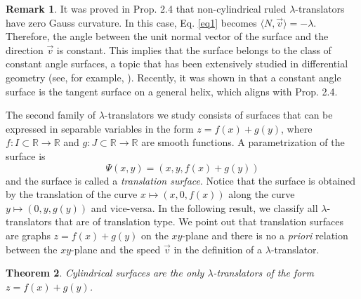 \documentclass[12pt]{amsart}
\def\r{\mathbb R}
\newtheorem{theorem}{Theorem}[section]
\theoremstyle{definition}
\newtheorem{remark}[theorem]{Remark}
\begin{document}
\begin{remark}
It was proved in Prop. 2.4 that non-cylindrical ruled $\lambda$-translators have zero Gauss curvature. In this case, Eq.   \eqref{eq1} becomes $\langle N, \vec{v} \rangle = -\lambda$. Therefore, the angle between the unit normal vector of the surface and the direction $\vec{v}$ is constant. This implies that the surface belongs to the class of constant angle surfaces, a topic that has been extensively studied in differential geometry (see, for example, \cite{cd, dfvv, dsr, mn}). Recently, it was shown in \cite{loy} that a constant angle surface is the tangent surface on a general helix, which aligns with Prop. 2.4.
\end{remark}

The second family of $\lambda$-translators we study consists of surfaces that can be expressed in separable  variables in the form $z=f(x)+g(y)$, where  $f:I\subset \r \to \r$ and $g:J\subset \r \to \r$ are smooth functions. A parametrization of the surface is
 $$
\Psi(x,y)=(x,y,f(x)+g(y)) 
$$ 
and the surface is called  a {\it translation surface}. Notice that the surface is obtained by the translation of the curve $x\mapsto (x,0,f(x))$ along the curve $y\mapsto(0,y,g(y))$ and vice-versa. In the following result, we classify all $\lambda$-translators that are of translation type. We point out that translation surfaces are graphs $z=f(x)+g(y)$ on the $xy$-plane and there is no a {\it priori} relation between the $xy$-plane and the speed $\vec{v}$ in the definition of a $\lambda$-translator. 

\begin{theorem} \label{pr-tra}
Cylindrical surfaces are the only $\lambda$-translators of the form $z=f(x)+g(y)$.
\end{theorem}
\end{document}

